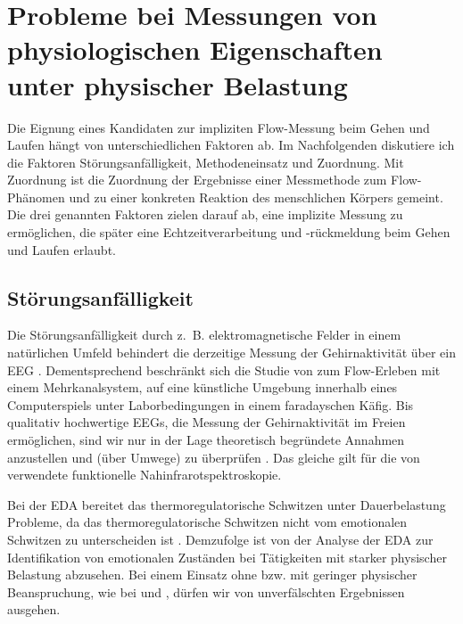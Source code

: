 
\section{Probleme bei Messungen von physiologischen Eigenschaften unter physischer Belastung} %
\label{sec:probleme_bei_messungen}

Die Eignung eines Kandidaten zur impliziten Flow-Messung beim Gehen und Laufen hängt von unterschiedlichen Faktoren ab. Im Nachfolgenden diskutiere ich die Faktoren Störungsanfälligkeit, Methodeneinsatz und Zuordnung. Mit Zuordnung ist die Zuordnung der Ergebnisse einer Messmethode zum Flow-Phänomen und zu einer konkreten Reaktion des menschlichen Körpers gemeint. Die drei genannten Faktoren zielen darauf ab, eine implizite Messung zu ermöglichen, die später eine Echtzeitverarbeitung und -rückmeldung beim Gehen und Laufen erlaubt.

\subsection{Störungsanfälligkeit} %
\label{sub:storungsanfalligkeit}

Die Störungsanfälligkeit durch z.~B. elektromagnetische Felder in einem natürlichen Umfeld behindert die derzeitige Messung der Gehirnaktivität über ein \ac{EEG} \citep[][S.~56]{Henk2014}. Dementsprechend beschränkt sich die Studie von \citet{Hugentobler2011} zum Flow-Erleben mit einem Mehrkanalsystem, auf eine künstliche Umgebung innerhalb eines Computerspiels unter Laborbedingungen in einem faradayschen Käfig. Bis qualitativ hochwertige \acp{EEG}, die Messung der Gehirnaktivität im Freien ermöglichen, sind wir nur in der Lage theoretisch begründete Annahmen anzustellen und (über Umwege) zu überprüfen \citep[][S.~56]{Henk2014}. Das gleiche gilt für die von \citet{Harmat2015} verwendete funktionelle Nahinfrarotspektroskopie.

Bei der EDA bereitet das thermoregulatorische Schwitzen unter Dauerbelastung Probleme, da das thermoregulatorische Schwitzen nicht vom emotionalen Schwitzen zu unterscheiden ist \citep{Baumeister2009}. Demzufolge ist von der Analyse der \ac{EDA} zur Identifikation von emotionalen Zuständen bei Tätigkeiten mit starker physischer Belastung abzusehen. Bei einem Einsatz ohne bzw. mit geringer physischer Beanspruchung, wie bei \citet{Kivikangas2006} und \citet{Nacke2008}, dürfen wir von unverfälschten Ergebnissen ausgehen.

